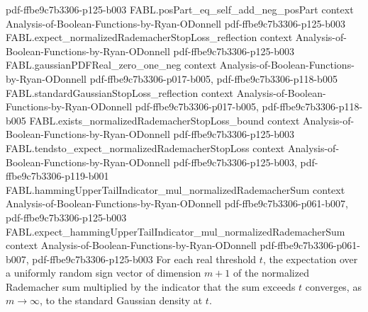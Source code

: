 \begin{theorem}
  {pdf-ffbe9c7b3306-p125-b003}
\proofstep
  {FABL.posPart_eq_self_add_neg_posPart}
  {context}
  {Analysis-of-Boolean-Functions-by-Ryan-ODonnell}
  {pdf-ffbe9c7b3306-p125-b003}
\proofstep
  {FABL.expect_normalizedRademacherStopLoss_reflection}
  {context}
  {Analysis-of-Boolean-Functions-by-Ryan-ODonnell}
  {pdf-ffbe9c7b3306-p125-b003}
\proofstep
  {FABL.gaussianPDFReal_zero_one_neg}
  {context}
  {Analysis-of-Boolean-Functions-by-Ryan-ODonnell}
  {pdf-ffbe9c7b3306-p017-b005,
    pdf-ffbe9c7b3306-p118-b005}
\proofstep
  {FABL.standardGaussianStopLoss_reflection}
  {context}
  {Analysis-of-Boolean-Functions-by-Ryan-ODonnell}
  {pdf-ffbe9c7b3306-p017-b005,
    pdf-ffbe9c7b3306-p118-b005}
\proofstep
  {FABL.exists_normalizedRademacherStopLoss_bound}
  {context}
  {Analysis-of-Boolean-Functions-by-Ryan-ODonnell}
  {pdf-ffbe9c7b3306-p125-b003}
\proofstep
  {FABL.tendsto_expect_normalizedRademacherStopLoss}
  {context}
  {Analysis-of-Boolean-Functions-by-Ryan-ODonnell}
  {pdf-ffbe9c7b3306-p125-b003,
    pdf-ffbe9c7b3306-p119-b001}
\proofstep
  {FABL.hammingUpperTailIndicator_mul_normalizedRademacherSum}
  {context}
  {Analysis-of-Boolean-Functions-by-Ryan-ODonnell}
  {pdf-ffbe9c7b3306-p061-b007,
    pdf-ffbe9c7b3306-p125-b003}
\proofstep
  {FABL.expect_hammingUpperTailIndicator_mul_normalizedRademacherSum}
  {context}
  {Analysis-of-Boolean-Functions-by-Ryan-ODonnell}
  {pdf-ffbe9c7b3306-p061-b007,
    pdf-ffbe9c7b3306-p125-b003}
For each real threshold $t$, the expectation over a uniformly random sign vector of
dimension $m+1$ of the normalized Rademacher sum multiplied by the indicator that the
sum exceeds $t$ converges, as $m\to\infty$, to the standard Gaussian density at $t$.
\end{theorem}

